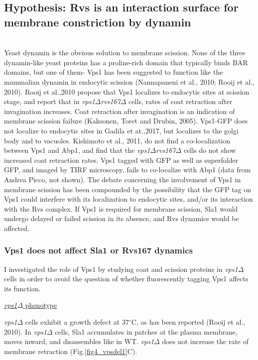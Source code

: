 \vspace{3mm}
\subsection{Hypothesis: Rvs is an interaction surface for membrane constriction by dynamin }
	\mbox{}\\
Yeast dynamin is the obvious solution to membrane scission. None of the three dynamin-like yeast proteins has a proline-rich domain that typically binds BAR domains, but one of them- Vps1 has been suggested to function like the mammalian dynamin in endocytic scission (Nannapaneni et al., 2010; Rooij et al., 2010). Rooij et al.,2010 propose that Vps1 localizes to endocytic sites at scission stage, and report that in \textit{vps1$\Delta$}\textit{rvs167$\Delta$} cells, rates of coat retraction after invagination increases. Coat retraction after invagination is an indication of membrane scission failure (Kaksonen, Toret and Drubin, 2005). Vps1-GFP does not localize to endocytic sites in Gadila et at.,2017, but localizes to the golgi body and to vacuoles. Kishimoto et al., 2011, do not find a co-localization between Vps1 and Abp1, and find that the \textit{vps1$\Delta$}\textit{rvs167$\Delta$} cells do not show increased coat retraction rates. Vps1 tagged with GFP as well as superfolder GFP, and imaged by TIRF microscopy, fails to co-localize with Abp1 (data from Andrea Picco, not shown). The debate concerning the involvement of Vps1 in membrane scission has been compounded by the possibility that the GFP tag on Vps1 could interfere with its localization to endocytic sites, and/or its interaction with the Rvs complex. If Vps1 is required for membrane scission, Sla1 would undergo delayed or failed scission in its absence, and Rvs dynamics would be affected. 



			\subsubsection{Vps1 does not affect Sla1 or Rvs167 dynamics }
I investigated the role of Vps1 by studying coat and scission proteins in \textit{vps1$\Delta$} cells in order to avoid the question of whether fluorescently tagging Vps1 affects its function. 
\vspace{5mm}

\underline{\textit{vps1$\Delta$} phenotype}

\textit{vps1$\Delta$} cells exhibit a growth defect at 37$^{\circ}$C, as has been reported (Rooij et al., 2010). In \textit{vps1$\Delta$} cells, Sla1 accumulates in patches at the plasma membrane, moves inward, and disassembles like in WT. \textit{vps1$\Delta$} does not increase the rate of membrane retraction  (Fig.\ref{fig4_vpsdel1}C). 

